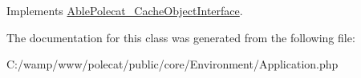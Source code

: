 Implements \hyperlink{interface_able_polecat___cache_object_interface_a3f2135f6ad45f51d075657f6d20db2cd}{Able\+Polecat\+\_\+\+Cache\+Object\+Interface}.



The documentation for this class was generated from the following file\+:\begin{DoxyCompactItemize}
\item 
C\+:/wamp/www/polecat/public/core/\+Environment/Application.\+php\end{DoxyCompactItemize}

